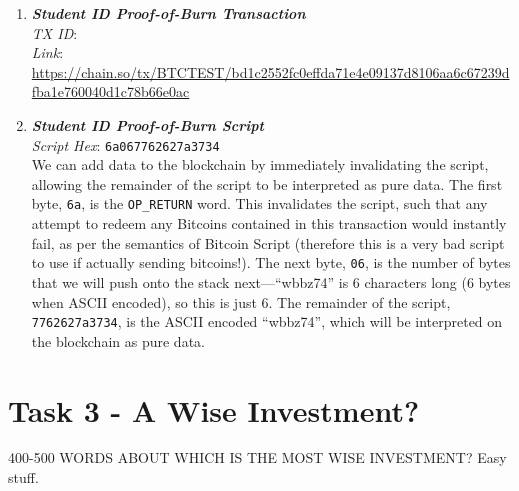 \documentclass[11pt]{article}
\begin{document}
\begin{enumerate}
\item \textbf{\textit{Student ID Proof-of-Burn Transaction}}\\
\textit{TX ID}: \texttt{}\\
\textit{Link}: \url{https://chain.so/tx/BTCTEST/bd1c2552fc0effda71e4e09137d8106aa6c67239dfba1e760040d1c78b66e0ac}

\item \textbf{\textit{Student ID Proof-of-Burn Script}}\\
\textit{Script Hex}: \texttt{6a067762627a3734}\\
We can add data to the blockchain by immediately invalidating the script, allowing the remainder of the script to be interpreted as pure data.
The first byte, \texttt{6a}, is the \texttt{OP\_RETURN} word. This invalidates the script, such that any attempt to redeem any Bitcoins contained in this transaction would instantly fail, as per the semantics of Bitcoin Script (therefore this is a very bad script to use if actually sending bitcoins!).
The next byte, \texttt{06}, is the number of bytes that we will push onto the stack next---``wbbz74'' is 6 characters long (6 bytes when ASCII encoded), so this is just 6. 
The remainder of the script, \texttt{7762627a3734}, is the ASCII encoded ``wbbz74'', which will be interpreted on the blockchain as pure data.

\end{enumerate}

\section*{Task 3 - A Wise Investment?}


400-500 WORDS ABOUT WHICH IS THE MOST WISE INVESTMENT? Easy stuff.
\end{document}
